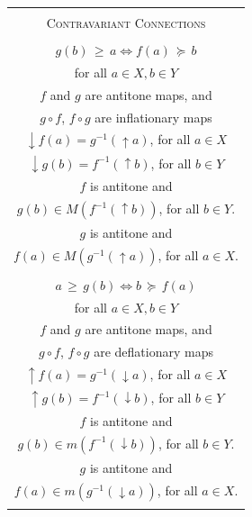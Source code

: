 \documentclass[
  letterpaper,
  10pt,
  reqno,
  twopage,
  openany]{book}
\theoremstyle{plain}
\theoremstyle{definition}
\theoremstyle{definition}
\theoremstyle{definition}
\theoremstyle{plain}
\theoremstyle{plain}
\theoremstyle{remark}
\begin{document}
\begin{figure}[htb]
\begin{tabular}{|c|} \hline 
\\[-7pt]
\textsc{Contravariant Connections}
\\[5pt]
\begin{minipage}{.45\textwidth} \centering 
$(f,g):(X,\geq) \leftrightarrow (Y,\succeq)$
\\[5pt] 
$g(b)\,\geq\,a \Leftrightarrow f(a)\,\succeq\,b$ \\ for all $a\in X, b\in Y$
\\[5pt] 
$f$ and $g$ are antitone maps, and \\ $g\circ f$, $f\circ g$ are inflationary maps
\\[5pt] 
${\downarrow} f(a)=g^{-1}({\uparrow} a)$, for all $a\in X$
\\[5pt] 
${\downarrow} g(b)=f^{-1}({\uparrow} b)$, for all $b\in Y$
\\[5pt] 
$f$ is antitone and \\ ${g(b)\in M(f^{-1}({\uparrow} b))}$, for all $b\in Y$.
\\[5pt] 
$g$ is antitone and \\ ${f(a)\in M(g^{-1}({\uparrow} a))}$, for all $a\in X$.
\\[-1pt] 
\end{minipage}
\begin{minipage}{.45\textwidth} \centering 
$(f,g):(X,\geq) \leftrightarrow (Y,\succeq)$
\\[5pt] 
$a\,\geq\,g(b) \Leftrightarrow b\,\succeq\,f(a)$ \\ for all $a\in X, b\in Y$
\\[5pt] 
$f$ and $g$ are antitone maps, and \\ $g\circ f$, $f\circ g$ are deflationary maps
\\[5pt] 
${\uparrow} f(a)=g^{-1}({\downarrow} a)$, for all $a\in X$
\\[5pt] 
${\uparrow} g(b)=f^{-1}({\downarrow} b)$, for all $b\in Y$
\\[5pt] 
$f$ is antitone and \\ ${g(b)\in m(f^{-1}({\downarrow} b))}$, for all $b\in Y$.
\\[5pt] 
$g$ is antitone and \\ ${f(a)\in m(g^{-1}({\downarrow} a))}$, for all $a\in X$.
\vspace{5pt}
\end{minipage}
\\[10pt] \hline 
\\[-7pt]

\end{tabular}
\end{figure}
\end{document}

